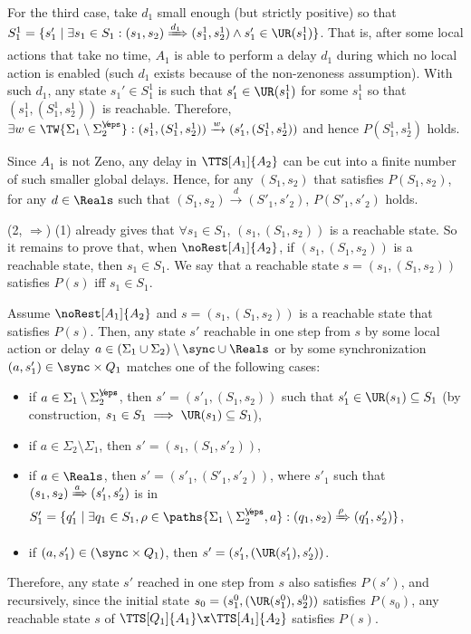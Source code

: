 \documentclass{LMCS}
\theoremstyle{plain}\newtheorem*{prop11}{Proposition~\ref{prop:states} bis}
\begin{document}
  For the third case, take $d_1$ small enough (but strictly positive) so that
  $S_1^1=\{s_1'\mid\exists s_1\in S_1:
  (s_1,s_2)\xRightarrow{d_1}(s_1^1,s_2^1) \land s'_1\in\UR(s_1^1)\}$.
  That is, after some local actions that take no time, $A_1$ is able to
  perform a delay $d_1$ during which no local action is enabled (such $d_1$
  exists because  of the non-zenoness assumption). With such $d_1$, any state
  $s_1'\in S_1^1$ is such that $s'_1\in\UR(s_1^1)$ for some $s_1^1$ so
  that $(s_1^1,(S_1^1,s_2^1))$ is reachable. Therefore,
  $\exists w\in\TW{\Sigma_1\setminus\Sigma_{2}^{\not\eps}}:(s_1^1,(S_1^1,s_2^1))
  \xrightarrow{w}(s'_1,(S_1^1,s_2^1))$ and hence $P(S_1^1,s_2^1)$ holds.

  Since $A_1$ is not Zeno, any delay in $\TTS[A_1]{A_2}$ can be cut into a
  finite number of such smaller global delays. Hence, for any $(S_1,s_2)$ that
  satisfies $P(S_1,s_2)$, for any $d\in \Reals$ such that
  $(S_1,s_2)\xrightarrow{d}(S'_1,s'_2)$, $P(S'_1,s'_2)$ holds.


  (2, $\Rightarrow$) (1) already gives that
  $\forall s_1\in S_1$, $(s_1,(S_1,s_2))$ is a reachable state.
  So it remains to prove that, when $\noRest[A_1]{A_2}$,
  if $(s_1,(S_1,s_2))$ is a reachable state, then
  $s_1\in S_1$. We say that a reachable state $s=(s_1,(S_1,s_2))$ satisfies
  $P(s)$ iff $s_1\in S_1$.

  Assume $\noRest[A_1]{A_2}$ and $s=(s_1,(S_1,s_2))$ is a reachable
  state that satisfies $P(s)$.
  Then, any state $s'$ reachable in one step from $s$ by some local action
  or delay $a\in(\Sigma_1\cup\Sigma_2)\setminus\sync\cup\Reals$ or by some synchronization
  $(a,s'_1)\in\sync\times Q_1$ matches one of the following cases:
  \begin{itemize}
    \item if $a\in\Sigma_1\setminus\Sigma_{2}^{\not\eps}$, then $s'=(s'_1,(S_1,s_2))$
    such that  $s'_1\in\UR(s_1)\subseteq S_1$ (by construction,
    $s_1\in S_1\implies\UR(s_1)\subseteq S_1$),
    \item if $a\in\Sigma_2\setminus\Sigma_1$, then $s'=(s_1,(S_1,s'_2))$,
    \item if $a\in\Reals$, then $s'=(s'_1,(S'_1,s'_2))$,
    where $s'_1$ such that $(s_1,s_2)\xRightarrow{a}(s'_1,s'_2)$ is in
    $S'_1=\{q'_1\mid\exists q_1\in S_1,\rho\in\paths{\Sigma_1\setminus\Sigma_{2}^{\not\eps},a}:
    (q_1,s_2)\xRightarrow{\rho}(q'_1,s'_2)\}$,
    \item if $(a,s'_1)\in(\sync\times Q_1)$, then
    $s'=(s'_1,(\UR(s'_1),s'_2))$.
  \end{itemize}
  Therefore, any state $s'$ reached in one step from $s$ also satisfies
  $P(s')$, and recursively, since the initial state
  $s_0=(s_1^0,(\UR(s_1^0),s_2^0))$ satisfies $P(s_0)$, any reachable state
  $s$ of $\TTS[Q_1]{A_1}\x\TTS[A_1]{A_2}$ satisfies $P(s)$.
\end{document}
